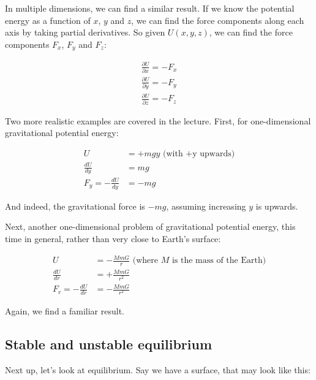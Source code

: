 In multiple dimensions, we can find a similar result. If we know the potential energy as a function of $x$, $y$ and $z$, we can find the force components along each axis by taking partial derivatives. So given $U(x, y, z)$, we can find the force components $F_x$, $F_y$ and $F_z$:

\begin{align}
\frac{\partial U}{\partial x} = - F_x\\
\frac{\partial U}{\partial y} = - F_y\\
\frac{\partial U}{\partial z} = - F_z
\end{align}

Two more realistic examples are covered in the lecture. First, for one-dimensional gravitational potential energy:

\begin{align}
U &= + m g y \text{ (with +y upwards)}\\
\frac{dU}{dy} &= m g\\
F_y = -\frac{dU}{dy} &= - mg
\end{align}

And indeed, the gravitational force is $- m g$, assuming increasing $y$ is upwards.

Next, another one-dimensional problem of gravitational potential energy, this time in general, rather than very close to Earth's surface:

\begin{align}
U &= -\frac{M m G}{r} \text{ (where $M$ is the mass of the Earth)}\\
\frac{dU}{dr} &= +\frac{M m G}{r^2}\\
F_r = -\frac{dU}{dr} &= -\frac{M m G}{r^2}
\end{align}

Again, we find a familiar result.

\subsection{Stable and unstable equilibrium}

Next up, let's look at equilibrium. Say we have a surface, that may look like this:

